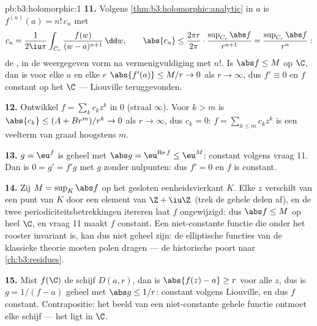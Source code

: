 \begin{solution}{pb:b3:holomorphic:1}
\textbf{11.} Volgens \cref{thm:b3:holomorphic:analytic} in $a$ is
$f^{(n)}(a) = n!\,c_n$ met
\[
c_n = \frac1{2\iu\pi}\int_{C_r}\frac{f(w)}{(w -
a)^{n+1}}\,\dd w,
\qquad
\abs{c_n} \leq \frac{2\pi r}{2\pi}\cdot
\frac{\sup_{C_r}\abs f}{r^{n+1}}
= \frac{\sup_{C_r}\abs f}{r^{n}} :
\]
de , in de weergegeven vorm na
vermenigvuldiging met $n!$. Is $\abs f \leq M$ op $\C$, dan is
voor elke $a$ en elke $r$ $\abs{f'(a)} \leq M/r \to 0$ als $r \to
\infty$, dus $f' \equiv 0$ en $f$ constant op het 
$\C$ --- Liouville teruggevonden.

\textbf{12.} Ontwikkel $f = \sum_kc_kz^k$ in $0$ (straal
$\infty$). Voor $k > m$ is $\abs{c_k} \leq (A + Br^m)/r^k \to 0$
als $r \to \infty$, dus $c_k = 0$: $f = \sum_{k\leq m}c_kz^k$ is
een veelterm van graad hoogstens $m$.

\textbf{13.} $g = \eu^f$ is geheel met $\abs g =
\eu^{\operatorname{Re}f} \leq \eu^M$: constant volgens vraag 11.
Dan is $0 = g' = f'g$ met $g$ zonder nulpunten: dus $f' = 0$ en
$f$ is constant.

\textbf{14.} Zij $M = \sup_K\abs f$ op het  gesloten
eenheidsvierkant $K$. Elke $z$ verschilt van een punt van $K$
door een element van $\Z + \iu\Z$ (trek de gehele delen af), en
de twee periodiciteitsbetrekkingen itereren laat $f$
ongewijzigd: dus $\abs f \leq M$ op heel $\C$, en vraag 11 maakt
$f$ constant. Een niet-constante functie die onder het rooster
invariant is, kan dus niet geheel zijn: de elliptische functies
van de klassieke theorie moeten polen dragen --- de historische
poort naar \cref{ch:b3:residues}.

\textbf{15.} Mist $f(\C)$ de schijf $D(a, r)$, dan is $\abs{f(z)
- a} \geq r$ voor alle $z$, dus is $g = 1/(f - a)$ geheel met
$\abs g \leq 1/r$: constant volgens Liouville, en dus $f$
constant. Contrapositie: het beeld van een niet-constante gehele
functie ontmoet elke schijf --- het ligt  in $\C$.


\end{solution}
